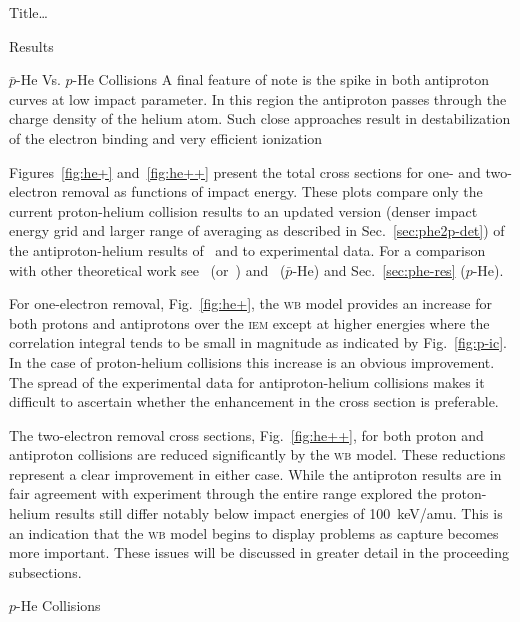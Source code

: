 \documentclass[letterpaper, 11 pt]{report}
\begin{document}
\begin{chapter}{ Title\dots \label{chap:p-he2p-he}}
\begin{section}{Results \label{sec:phe2p-res}}
\begin{subsection}{ \texorpdfstring{$\bar{p}$}{pbar}-He Vs. \texorpdfstring{$p$}{p}-He Collisions
                         \label{sec:pbarhe-res}}
         A final feature of note is the spike in both antiproton curves at low impact parameter. In this
         region the antiproton passes through the charge density of the helium atom. Such close
         approaches result in destabilization of the electron binding and very efficient
         ionization~\cite{pbarhe-rev}

         Figures~\ref{fig:he+} and~\ref{fig:he++} present the total cross sections for one- and
         two-electron removal as functions of impact energy. These plots compare only the current
         proton-helium collision results to an updated version (denser impact energy grid and larger
         range of averaging as described in Sec.~\ref{sec:phe2p-det}) of the antiproton-helium results
         of~\cite{pbarhe} and to experimental data. For a comparison with other theoretical work
         see~\cite{thesis} (or~\cite{pbarhe}) and~\cite{new-pbarhe} ($\bar{p}$-He) and
         Sec.~\ref{sec:phe-res} ($p$-He).
 
         For one-electron removal, Fig.~\ref{fig:he+}, the \textsc{wb} model provides an increase for
         both protons and antiprotons over the \textsc{iem} except at higher energies where the
         correlation integral tends to be small in magnitude as indicated by Fig.~\ref{fig:p-ic}. In the
         case of proton-helium collisions this increase is an obvious improvement. The spread of the
         experimental data for antiproton-helium collisions makes it difficult to ascertain whether the
         enhancement in the cross section is preferable.
 
         The two-electron removal cross sections, Fig.~\ref{fig:he++}, for both proton and antiproton
         collisions are reduced significantly by the \textsc{wb} model. These reductions represent a
         clear improvement in either case. While the antiproton results are in fair agreement with
         experiment through the entire range explored the proton-helium results still differ notably
         below impact energies of 100~keV/amu. This is an indication that the \textsc{wb} model begins
         to display problems as capture becomes more important. These issues will be discussed in
         greater detail in the proceeding subsections.

      \end{subsection}

      \begin{subsection}{\texorpdfstring{$p$}{p}-He Collisions \label{sec:phe-res}}


\end{subsection}
\end{section}
\end{chapter}
\end{document}
